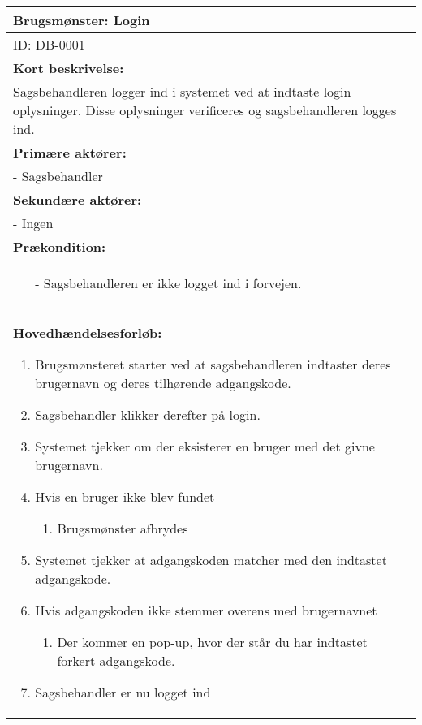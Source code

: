 \documentclass[../../main.tex]{subfiles}
\begin{document}
\begin{center}
\tiny
\begin{longtable}{| p{}|} \hline
Brugsmønster: Login  \\ \hline

ID: DB-0001 \\ \hline

\textbf{Kort beskrivelse:} \\
Sagsbehandleren logger ind i systemet ved at indtaste login oplysninger. Disse oplysninger verificeres og sagsbehandleren logges ind.   \\ \hline

\textbf{Primære aktører:} \\
- Sagsbehandler \\ \hline

\textbf{Sekundære  aktører:} \\
- Ingen  \\ \hline

\textbf{Prækondition:} \\
  \begin{minipage}[t]{\textwidth}
    \begin{itemize}
    \item[-] Sagsbehandleren er ikke logget ind i forvejen.
    \end{itemize}
  \end{minipage} \\ \hline

\textbf{Hovedhændelsesforløb:} 
 \begin{adjustwidth}{1cm}{}
  \begin{enumerate}
  \item Brugsmønsteret starter ved at sagsbehandleren indtaster deres brugernavn og deres tilhørende adgangskode.
	\item Sagsbehandler klikker derefter på login.
    \item Systemet tjekker om der eksisterer en bruger med det givne brugernavn.
    \item Hvis en bruger ikke blev fundet
	\begin{enumerate}[label=\Alph*]
	\item Brugsmønster afbrydes 
	\end{enumerate}
    \item Systemet tjekker at adgangskoden matcher med den indtastet adgangskode.
	\item Hvis adgangskoden ikke stemmer overens med brugernavnet
    \begin{enumerate}[label=\Alph*]
    \item Der kommer en pop-up, hvor der står du har indtastet forkert adgangskode.
    \end{enumerate}
    \item Sagsbehandler er nu logget ind
  \end{enumerate}
  \end{adjustwidth} \\ \hline


\end{longtable}
\end{center}
\end{document}
